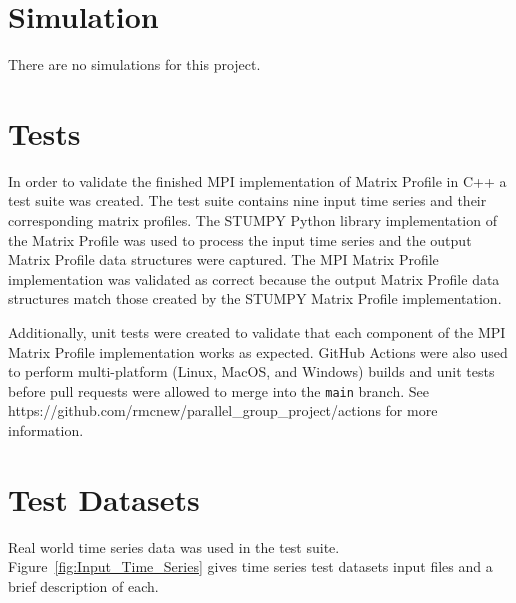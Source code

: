 \documentclass[conference]{IEEEtran}
\begin{document}
\section{Simulation}
There are no simulations for this project.

\section{Tests}
In order to validate the finished MPI implementation of Matrix Profile in C++ a test suite was created.  The test suite contains nine input time series and their corresponding matrix profiles.  The STUMPY\cite{Stumpy} Python library implementation of the Matrix Profile was used to process the input time series and the output Matrix Profile data structures were captured.  The MPI Matrix Profile implementation was validated as correct because the output Matrix Profile data structures match those created by the STUMPY Matrix Profile implementation. 

Additionally, unit tests were created to validate that each component of the MPI Matrix Profile implementation works as expected.  GitHub Actions were also used to perform multi-platform (Linux, MacOS, and Windows) builds and unit tests before pull requests were allowed to merge into the \texttt{main} branch.  See https://github.com/rmcnew/parallel\_group\_project/actions for more information.

\section{Test Datasets}
Real world time series data was used in the test suite.  Figure~\ref{fig:Input_Time_Series} gives time series test datasets input files and a brief description of each.
\end{document}
